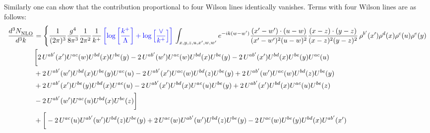 \documentclass[aps,prd,amsmath,amssymb,nofootinbib]{revtex4-2}
\numberwithin{equation}{section}
\begin{document}
Similarly one can show that the contribution proportional to four Wilson lines identically vanishes. Terms with four Wilson lines are as follows:
\begin{align}
   \frac{d^{3}N_{\rm NLO}^{\rm}}{d^{3}k}  & =  \Bigg\{\frac{1}{(2\pi)^{3}}\frac{g^{4}}{8\pi^{3}}\frac{1}{2\pi^{2}} \frac{1}{k^{+}}\,{\color{blue}\left[\log{\left[\frac{k^{+}}{\Lambda}\right]}+\log{\left[\frac{\vee}{k^{+}}\right]}\right]}\,\int_{x,y,z,u,x^{\prime},w,w^{\prime}}e^{-ik(w-w^{\prime})}\frac{(x^{\prime}-w^{\prime})\cdot (u-w)}{(x^{\prime}-w^{\prime})^{2} (u-w)^{2}} \frac{(x-z)\cdot (y-z)}{(x-z)^{2}(y-z)^{2}}\,\rho^{b^{\prime}}(x^{\prime})\rho^{d}(x)\rho^{c}(u)\rho^{e}(y)\notag \\ & \bigg[2\,U^{ab'}(x')U^{ac}(w)U^{bd}(x)U^{be}(y) -2\, U^{ab'}(w')U^{ac}(w)U^{bd}(x)U^{be}(y) - 2\,U^{ab'}(x')U^{bd}(x)U^{be}(y)U^{ac}(u) \notag \\  & + 2\, U^{ab'}(w')U^{bd}(x)U^{be}(y)U^{ac}(u)-2\,U^{ab'}(x')U^{ac}(w)U^{bd}(z)U^{be}(y) + 2\,U^{ab'}(w')U^{ac}(w)U^{bd}(z)U^{be}(y) \notag \\ &+2\,U^{ab'}(x')U^{be}(y)U^{bd}(x)U^{ac}(u) -2\,U^{ab'}(x')U^{bd}(x)U^{ac}(u)U^{be}(y) +2\, U^{ab'}(x')U^{bd}(x)U^{ac}(u)U^{be}(z) \notag \\ & - 2\,U^{ab'}(w')U^{ac}(u)U^{bd}(x)U^{be}(z)\bigg]\notag \\ & + \bigg[-2\,U^{ac}(u)U^{ab'}(w')U^{bd}(z)U^{be}(y) + 2\,U^{ac}(w)U^{ab'}(w')U^{bd}(z)U^{be}(y) - 2\,U^{ac}(w)U^{be}(y)U^{bd}(x)U^{ab'}(x') \notag \\

\end{align}
\end{document}
